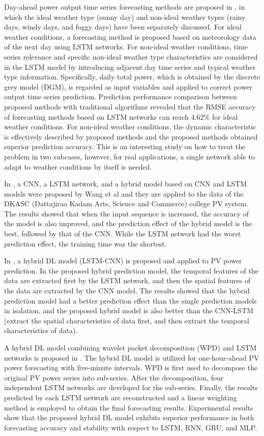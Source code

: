 Day-ahead power output time series forecasting methods are proposed in \cite{GAO2019115838}, in which the ideal weather type (sunny day) and non-ideal weather types (rainy days, windy days, and foggy days) have been separately discussed.
For ideal weather conditions, a forecasting method is proposed based on meteorology data of the next day using LSTM networks.
For non-ideal weather conditions, time series relevance and specific non-ideal weather type characteristics are considered in the LSTM model by introducing adjacent day time series and typical weather type information.
Specifically, daily total power, which is obtained by the discrete grey model (DGM), is regarded as input variables and applied to correct power output time series prediction.
Prediction performance comparison between proposed methods with traditional algorithms revealed that the RMSE accuracy of forecasting methods based on LSTM networks can reach 4.62\% for ideal weather conditions.
For non-ideal weather conditions, the dynamic characteristic is effectively described by proposed methods and the proposed methods obtained superior prediction accuracy.
This is an interesting study on how to treat the problem in two subcases, however,  for real applications, a single network able to adapt to weather conditions by itself is needed.

In \cite{WANG2019113315}, a CNN, a LSTM network, and a hybrid model based on CNN and LSTM models were proposed by Wang et al and they are applied to the data of the DKASC (Dattajirao Kadam Arts, Science and Commerce) college PV system.
The results showed that when the input sequence is increased, the accuracy of the model is also improved, and the prediction effect of the hybrid model is the best, followed by that of the CNN.
While the LSTM network had the worst prediction effect, the training time was the shortest.

In \cite{WANG2019116225}, a hybrid DL model (LSTM-CNN) is proposed and applied to PV power prediction.
In the proposed hybrid prediction model, the temporal features of the data are extracted first by the LSTM network, and then the spatial features of the data are extracted by the CNN model.
The results showed that the hybrid prediction model had a better prediction effect than the single prediction models in isolation, and the proposed hybrid model is also better than the CNN-LSTM (extract the spatial characteristics of data first, and then extract the temporal characteristics of data).

A hybrid DL model combining wavelet packet decomposition (WPD) and LSTM networks is proposed in \cite{LI2020114216}.
The hybrid DL model is utilized for one-hour-ahead PV power forecasting with five-minute intervals.
WPD is first used to decompose the original PV power series into sub-series.
After the decomposition, four independent LSTM networks are developed for the sub-series.
Finally, the results predicted by each LSTM network are reconstructed and a linear weighting method is employed to obtain the final forecasting results.
Experimental results show that the proposed hybrid DL model exhibits superior performance in both forecasting accuracy and stability with respect to LSTM, RNN, GRU, and MLP.

